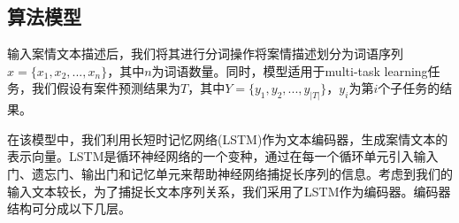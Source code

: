 \subsection{算法模型}
输入案情文本描述后，我们将其进行分词操作将案情描述划分为词语序列$x = \{x_{1}, x_{2}, ..., x_{n}\}$，其中$n$为词语数量。同时，模型适用于multi-task learning任务，我们假设有案件预测结果为$T$，其中$Y = \{y_{1}, y_{2}, ..., y_{|T|}\}$，$y_{i}$为第$i$个子任务的结果。

在该模型中，我们利用长短时记忆网络(LSTM)作为文本编码器，生成案情文本的表示向量。LSTM是循环神经网络的一个变种，通过在每一个循环单元引入输入门、遗忘门、输出门和记忆单元来帮助神经网络捕捉长序列的信息。考虑到我们的输入文本较长，为了捕捉长文本序列关系，我们采用了LSTM作为编码器。编码器结构可分成以下几层。
